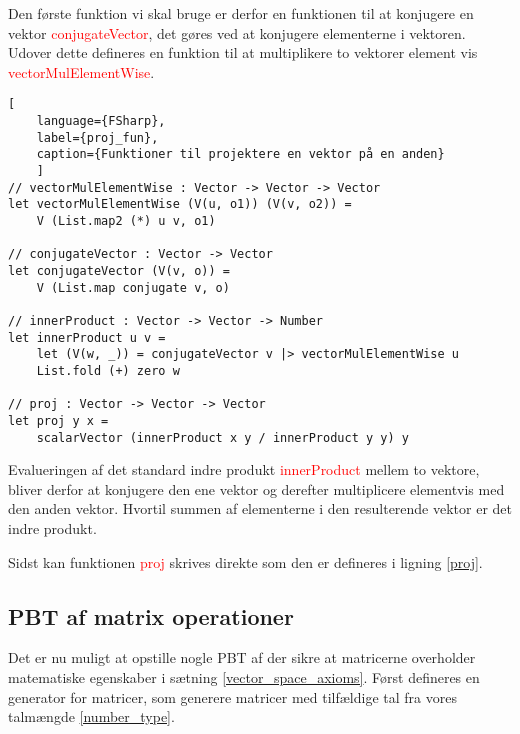 Den første funktion vi skal bruge er derfor en funktionen til at konjugere en vektor \textcolor{red}{conjugateVector}, det gøres ved at konjugere elementerne i vektoren. Udover dette defineres en funktion til at multiplikere to vektorer element vis \textcolor{red}{vectorMulElementWise}. 

\begin{lstlisting}[
    language={FSharp}, 
    label={proj_fun}, 
    caption={Funktioner til projektere en vektor på en anden}
    ]
// vectorMulElementWise : Vector -> Vector -> Vector
let vectorMulElementWise (V(u, o1)) (V(v, o2)) =
    V (List.map2 (*) u v, o1)

// conjugateVector : Vector -> Vector
let conjugateVector (V(v, o)) = 
    V (List.map conjugate v, o)

// innerProduct : Vector -> Vector -> Number
let innerProduct u v =
    let (V(w, _)) = conjugateVector v |> vectorMulElementWise u
    List.fold (+) zero w

// proj : Vector -> Vector -> Vector   
let proj y x =
    scalarVector (innerProduct x y / innerProduct y y) y
\end{lstlisting}

Evalueringen af det standard indre produkt \textcolor{red}{innerProduct} mellem to vektore, bliver derfor at konjugere den ene vektor og derefter multiplicere elementvis med den anden vektor. Hvortil summen af elementerne i den resulterende vektor er det indre produkt.

Sidst kan funktionen \textcolor{red}{proj} skrives direkte som den er defineres i ligning \ref{proj}.

\subsection{PBT af matrix operationer}
Det er nu muligt at opstille nogle PBT af der sikre at matricerne overholder matematiske egenskaber i sætning \ref{vector_space_axioms}. Først defineres en generator for matricer, som generere matricer med tilfældige tal fra vores talmængde \ref{number_type}.


